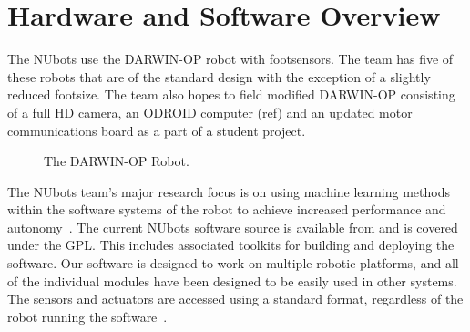 \documentclass{llncs}
\begin{document}
\section{Hardware and Software Overview}
The NUbots use the DARWIN-OP robot with footsensors. The team has five of these robots that are of the standard design with the exception of a slightly reduced footsize. The team also hopes to field modified DARWIN-OP consisting of a full HD camera, an ODROID computer (ref) and an updated motor communications board as a part of a student project. %

\begin{figure}
\begin{center}
\caption{The DARWIN-OP Robot.}
\label{fig:darwin}
\end{center}
\end{figure}

The NUbots team's major research focus is on using machine learning methods within the software systems of the robot to achieve increased performance and autonomy~\cite{ChalupEtAlSMC2007}. The current NUbots software source is available from \cite{nubotsGit} and is covered under the GPL. This includes associated toolkits for building and deploying the software. Our software is designed to work on multiple robotic platforms, and all of the individual modules have been designed to be easily used in other systems. The sensors and actuators are accessed using a standard format, regardless of the robot running the software~\cite{Kulk2011c}. 
\end{document}

